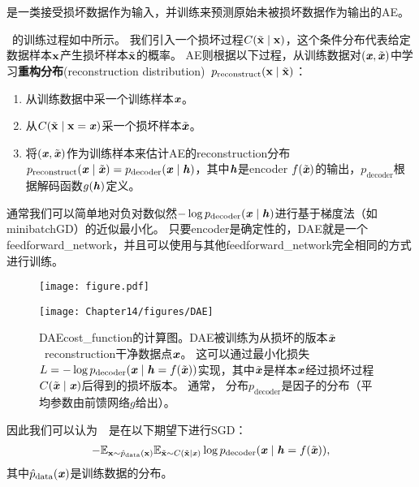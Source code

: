 \section{}
\label{sec:denoising_autoencoders}
是一类接受损坏数据作为输入，并训练来预测原始未被损坏数据作为输出的\gls{AE}。


~的训练过程如中所示。
我们引入一个损坏过程$C(\tilde{\mathbf{x}} \mid \mathbf{x})$，这个条件分布代表给定数据样本$\mathbf{x}$产生损坏样本$\tilde {\mathbf{x}}$的概率。
\gls{AE}则根据以下过程，从训练数据对$(\boldsymbol{\mathit{x}}, \tilde {\boldsymbol{\mathit{x}}})$中学习\textbf{重构分布}(reconstruction distribution)~$p_{\text{reconstruct}} (\mathbf{x} \mid \tilde {\mathbf{x}})$：
\begin{enumerate}
\item 从训练数据中采一个训练样本$\boldsymbol{\mathit{x}}$。
\item 从$C(\tilde{\mathbf{x}} \mid \mathbf{x}=\boldsymbol{\mathit{x}})$采一个损坏样本$\tilde {\boldsymbol{\mathit{x}}}$。
\item 将$(\boldsymbol{\mathit{x}}, \tilde {\boldsymbol{\mathit{x}}})$作为训练样本来估计\gls{AE}的\gls{reconstruction}分布 
$p_{\text{reconstruct}} (\boldsymbol{\mathit{x}} \mid \tilde {\boldsymbol{\mathit{x}}}) = p_{\text{decoder}}(\boldsymbol{\mathit{x}} \mid\boldsymbol{\mathit{h}})$，其中$\boldsymbol{\mathit{h}}$是\gls{encoder} $f(\tilde {\boldsymbol{\mathit{x}}})$的输出，$p_{\text{decoder}}$根据解码函数$g(\boldsymbol{\mathit{h}})$定义。
\end{enumerate}
通常我们可以简单地对负对数似然$-\log p_{\text{decoder}} (\boldsymbol{\mathit{x}} \mid \boldsymbol{\mathit{h}})$进行基于梯度法（如\gls{minibatch}\gls{GD}）的近似最小化。
只要\gls{encoder}是确定性的，\gls{DAE}就是一个\gls{feedforward_network}，并且可以使用与其他\gls{feedforward_network}完全相同的方式进行训练。

\begin{figure}[!htb]
\ifOpenSource
\centerline{\texttt{[image: figure.pdf]}}
\else
\centerline{\texttt{[image: Chapter14/figures/DAE]}}
\fi
\caption{\gls{DAE}\gls{cost_function}的计算图。\gls{DAE}被训练为从损坏的版本$\tilde {\boldsymbol{\mathit{x}}}$~\gls{reconstruction}干净数据点$\boldsymbol{\mathit{x}}$。
这可以通过最小化损失$L = - \log p_{\text{decoder}} (\boldsymbol{\mathit{x}} \mid \boldsymbol{\mathit{h}} = f(\tilde {\boldsymbol{\mathit{x}}}))$实现，其中$\tilde {\boldsymbol{\mathit{x}}}$是样本$\boldsymbol{\mathit{x}}$经过损坏过程$C (\tilde {\boldsymbol{\mathit{x}}} \mid \boldsymbol{\mathit{x}})$后得到的损坏版本。
通常， 分布$p_{\text{decoder}}$是因子的分布（平均参数由前馈网络$g$给出）。
}
\label{fig:chap14_DAE}
\end{figure}

因此我们可以认为~~是在以下期望下进行\gls{SGD}：
\begin{align}
   - \mathbb{E}_{\mathbf{x} \sim \hat{p}_{\text{data}}(\mathbf{x})} \mathbb{E}_{\tilde{\mathbf{x}} \sim C(\tilde{\mathbf{x}}\mid\boldsymbol{\mathit{x}})} \log p_{\text{decoder}}(\boldsymbol{\mathit{x}} \mid \boldsymbol{\mathit{h}} = f(\tilde{\boldsymbol{\mathit{x}}})),
\end{align}
其中$\hat{p}_{\text{data}}(\boldsymbol{\mathit{x}})$是训练数据的分布。

